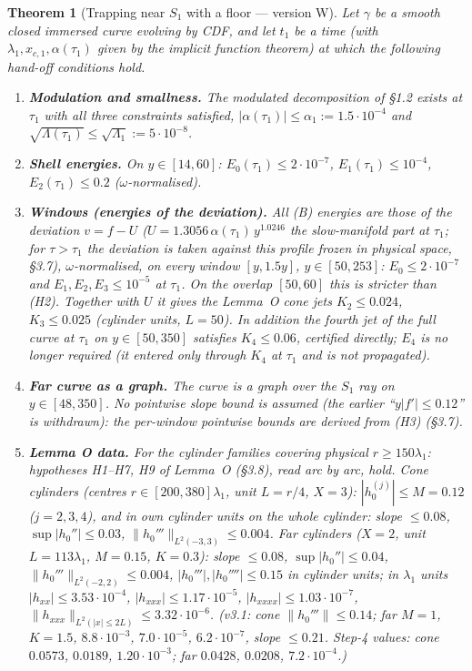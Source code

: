 \documentclass[11pt]{article}
\newtheorem{theorem}{Theorem}
\theoremstyle{definition}
\theoremstyle{remark}
\newcommand{\norm}[1]{\lVert #1\rVert}
\begin{document}
\begin{theorem}[Trapping near $S_1$ with a floor --- version W]\label{thm:W}
Let $\gamma$ be a smooth closed \emph{immersed} curve evolving by CDF, and let $t_1$ be a time (with $\lambda_1,x_{c,1},\alpha(\tau_1)$ given by the implicit function theorem) at which the following hand-off conditions hold.
\begin{enumerate}[label=\textup{(H\arabic*)},leftmargin=*]
\item \textbf{Modulation and smallness.} The modulated decomposition of \S1.2 exists at $\tau_1$ with all three constraints satisfied, $|\alpha(\tau_1)|\le\alpha_1:=1.5\cdot10^{-4}$ and $\sqrt{\Lambda(\tau_1)}\le\sqrt{\Lambda_1}:=5\cdot10^{-8}$.
\item \textbf{Shell energies.} On $y\in[14,60]$: $E_0(\tau_1)\le2\cdot10^{-7}$, $E_1(\tau_1)\le10^{-4}$, $E_2(\tau_1)\le0.2$ ($\omega$-normalised).
\item \textbf{Windows (energies of the deviation).} All (B) energies are those of the \emph{deviation} $v=f-U$ ($U=1.3056\,\alpha(\tau_1)\,y^{1.0246}$ the slow-manifold part at $\tau_1$; for $\tau>\tau_1$ the deviation is taken against this profile frozen in physical space, \S3.7), $\omega$-normalised, on every window $[y,1.5y]$, $y\in[50,253]$: $E_0\le2\cdot10^{-7}$ and $E_1,E_2,E_3\le10^{-5}$ at $\tau_1$. On the overlap $[50,60]$ this is stricter than (H2). Together with $U$ it gives the Lemma~O cone jets $K_2\le0.024$, $K_3\le0.025$ (cylinder units, $L=50$). In addition the fourth jet of the full curve at $\tau_1$ on $y\in[50,350]$ satisfies $K_4\le0.06$, \emph{certified directly}; $E_4$ is no longer required (it entered only through $K_4$ at $\tau_1$ and is not propagated).
\item \textbf{Far curve as a graph.} The curve is a graph over the $S_1$ ray on $y\in[48,350]$. No pointwise slope bound is assumed (the earlier ``$y|f'|\le0.12$'' is withdrawn): the per-window pointwise bounds are \emph{derived} from (H3) (\S3.7).
\item \textbf{Lemma O data.} For the cylinder families covering physical $r\ge150\lambda_1$: hypotheses H1--H7, H9 of Lemma~O (\S3.8), read arc by arc, hold. Cone cylinders (centres $r\in[200,380]\lambda_1$, unit $L=r/4$, $X=3$): $|h_0^{(j)}|\le M=0.12$ ($j=2,3,4$), and in own cylinder units on the whole cylinder: slope $\le0.08$, $\sup|h_0''|\le0.03$, $\norm{h_0'''}_{L^2(-3,3)}\le0.004$. Far cylinders ($X=2$, unit $L=113\lambda_1$, $M=0.15$, $K=0.3$): slope $\le0.08$, $\sup|h_0''|\le0.04$, $\norm{h_0'''}_{L^2(-2,2)}\le0.004$, $|h_0'''|,|h_0''''|\le0.15$ in cylinder units; in $\lambda_1$ units $|h_{xx}|\le3.53\cdot10^{-4}$, $|h_{xxx}|\le1.17\cdot10^{-5}$, $|h_{xxxx}|\le1.03\cdot10^{-7}$, $\norm{h_{xxx}}_{L^2(|x|\le2L)}\le3.32\cdot10^{-6}$. (v3.1: cone $\norm{h_0'''}\le0.14$; far $M=1$, $K=1.5$, $8.8\cdot10^{-3}$, $7.0\cdot10^{-5}$, $6.2\cdot10^{-7}$, slope $\le0.21$. Step-4 values: cone $0.0573$, $0.0189$, $1.20\cdot10^{-3}$; far $0.0428$, $0.0208$, $7.2\cdot10^{-4}$.)

\end{enumerate}
\end{theorem}
\end{document}
